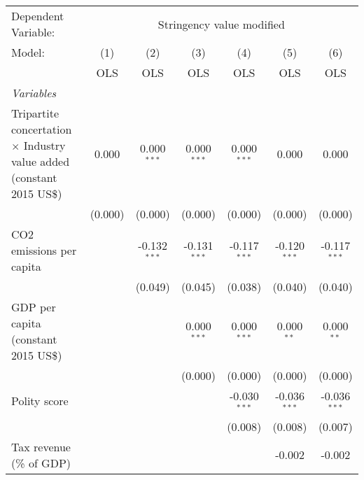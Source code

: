 
\begingroup
\centering
\begin{tabular}{lcccccc}
   \toprule
   Dependent Variable: & \multicolumn{6}{c}{Stringency value modified}\\
   Model:                                                                       & (1)     & (2)            & (3)            & (4)            & (5)            & (6)\\  
                                                                                &  OLS    & OLS            & OLS            & OLS            & OLS            & OLS\\  
   \midrule
   \emph{Variables}\\
   Tripartite concertation $\times$ Industry value added (constant 2015 US\$)   & 0.000   & 0.000$^{***}$  & 0.000$^{***}$  & 0.000$^{***}$  & 0.000          & 0.000\\   
                                                                                & (0.000) & (0.000)        & (0.000)        & (0.000)        & (0.000)        & (0.000)\\   
   CO2 emissions per capita                                                     &         & -0.132$^{***}$ & -0.131$^{***}$ & -0.117$^{***}$ & -0.120$^{***}$ & -0.117$^{***}$\\   
                                                                                &         & (0.049)        & (0.045)        & (0.038)        & (0.040)        & (0.040)\\   
   GDP per capita (constant 2015 US\$)                                          &         &                & 0.000$^{***}$  & 0.000$^{***}$  & 0.000$^{**}$   & 0.000$^{**}$\\   
                                                                                &         &                & (0.000)        & (0.000)        & (0.000)        & (0.000)\\   
   Polity score                                                                 &         &                &                & -0.030$^{***}$ & -0.036$^{***}$ & -0.036$^{***}$\\   
                                                                                &         &                &                & (0.008)        & (0.008)        & (0.007)\\   
   Tax revenue (\% of GDP)                                                      &         &                &                &                & -0.002         & -0.002\\   

\end{tabular}
